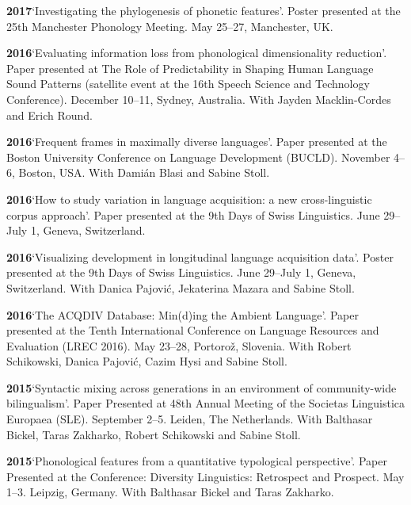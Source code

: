 \documentclass[11pt]{article}
\newcommand{\hangpara}{
 \setlength{\parindent}{0in} %
 \hangindent=0.42in %
}
\begin{document}
\vskip 6pt
\hangpara
{\bf 2017}\hspace{1ex}`Investigating the phylogenesis of phonetic features'. Poster presented at the 25th Manchester Phonology Meeting. May 25--27, Manchester, UK.

\vskip 6pt
\hangpara
{\bf 2016}\hspace{1ex}`Evaluating information loss from phonological dimensionality reduction'. Paper presented at The Role of Predictability in Shaping Human Language Sound Patterns (satellite event at the 16th Speech Science and Technology Conference). December 10--11, Sydney, Australia. With Jayden Macklin-Cordes and Erich Round.

\vskip 6pt
\hangpara
{\bf 2016}\hspace{1ex}`Frequent frames in maximally diverse languages'. Paper presented at the Boston University Conference on Language Development (BUCLD). November 4--6, Boston, USA. With Dami{\'a}n Blasi and Sabine Stoll.

\vskip 6pt
\hangpara
{\bf 2016}\hspace{1ex}`How to study variation in language acquisition: a new cross-linguistic corpus approach'. Paper presented at the 9th Days of Swiss Linguistics. June 29--July 1, Geneva, Switzerland.

\vskip 6pt
\hangpara
{\bf 2016}\hspace{1ex}`Visualizing development in longitudinal language acquisition data'. Poster presented at the 9th Days of Swiss Linguistics. June 29--July 1, Geneva, Switzerland. With Danica Pajovi{\'c}, Jekaterina Mazara and Sabine Stoll.

\vskip 6pt
\hangpara
{\bf 2016}\hspace{1ex}`The ACQDIV Database: Min(d)ing the Ambient Language'. Paper presented at the Tenth International Conference on Language Resources and Evaluation (LREC 2016). May 23--28, Portoro{\v z}, Slovenia. With Robert Schikowski, Danica Pajovi{\'c}, Cazim Hysi and Sabine Stoll.

\vskip 6pt
\hangpara
{\bf 2015}\hspace{1ex}`Syntactic mixing across generations in an environment of community-wide bilingualism'. Paper Presented at 48th Annual Meeting of the Societas Linguistica Europaea (SLE). September 2--5. Leiden, The Netherlands. With Balthasar Bickel, Taras Zakharko, Robert Schikowski and Sabine Stoll.

\vskip 6pt
\hangpara
{\bf 2015}\hspace{1ex}`Phonological features from a quantitative typological perspective'. Paper Presented at the Conference: Diversity Linguistics: Retrospect and Prospect. May 1--3. Leipzig, Germany. With Balthasar Bickel and Taras Zakharko.
\end{document}

